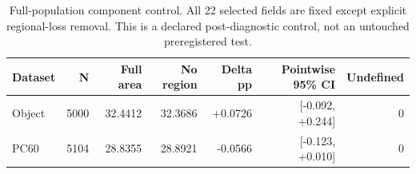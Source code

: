 \begin{table}[htbp]
\centering\scriptsize
\caption{Full-population component control. All 22 selected fields are fixed except explicit regional-loss removal. This is a declared post-diagnostic control, not an untouched preregistered test.}
\label{tab:full-component}
\setlength{\tabcolsep}{4pt}
\begin{tabular}{lrrrrrr}
\toprule
Dataset & N & Full area & No region & Delta pp & Pointwise 95\% CI & Undefined \\
\midrule
Object & 5000 & 32.4412 & 32.3686 & +0.0726 & [-0.092, +0.244] & 0 \\
PC60 & 5104 & 28.8355 & 28.8921 & -0.0566 & [-0.123, +0.010] & 0 \\
\bottomrule
\end{tabular}
\end{table}
